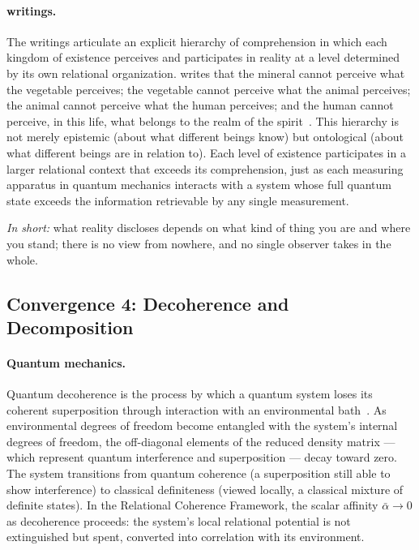 \paragraph{\bahai writings.}
The \bahai writings articulate an explicit hierarchy of comprehension
in which each kingdom of existence perceives and participates in reality
at a level determined by its own relational organization.
\AbdulBaha writes that the mineral cannot perceive what the vegetable
perceives; the vegetable cannot perceive what the animal perceives;
the animal cannot perceive what the human perceives; and the human
cannot perceive, in this life, what belongs to the realm of the
spirit~\citep[Part 4]{SAQ}. %
This hierarchy is not merely epistemic (about what different beings know)
but ontological (about what different beings are in relation to).
Each level of existence participates in a larger relational context
that exceeds its comprehension, just as each measuring apparatus in
quantum mechanics interacts with a system whose full quantum state
exceeds the information retrievable by any single measurement.

\emph{In short:} what reality discloses depends on what kind of thing
you are and where you stand; there is no view from nowhere, and no
single observer takes in the whole.

\subsection{Convergence 4: Decoherence and Decomposition}

\paragraph{Quantum mechanics.}
Quantum decoherence is the process by which a quantum system loses its
coherent superposition through interaction with an environmental
bath~\citep{Zurek2003}.
As environmental degrees of freedom become entangled with the system's
internal degrees of freedom, the off-diagonal elements of the reduced
density matrix --- which represent quantum interference and
superposition --- decay toward zero.
The system transitions from quantum coherence (a superposition still able
to show interference) to classical definiteness (viewed locally, a
classical mixture of definite states).
In the Relational Coherence Framework, the scalar affinity
$\bar\alpha \to 0$ as decoherence proceeds: the system's local relational
potential is not extinguished but spent, converted into correlation with
its environment.

